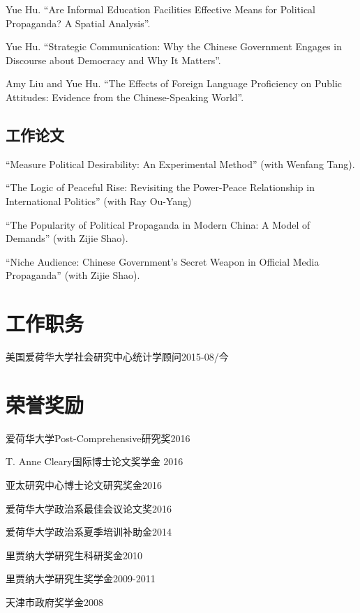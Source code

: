 \documentclass[10.5pt,]{article}
\providecommand{\tightlist}{%
	\setlength{\itemsep}{0pt}\setlength{\parskip}{0pt}}
\renewenvironment{itemize}{
	\begin{list}{}{
			\setlength{\leftmargin}{1.5em}
		}
	}{
	\end{list}
}
\begin{document}
Yue Hu. ``Are Informal Education Facilities Effective Means for
Political Propaganda? A Spatial Analysis''.

Yue Hu. ``Strategic Communication: Why the Chinese Government Engages in
Discourse about Democracy and Why It Matters''.

Amy Liu and Yue Hu. ``The Effects of Foreign Language Proficiency on
Public Attitudes: Evidence from the Chinese-Speaking World''.

\subsection{工作论文}

``Measure Political Desirability: An Experimental Method'' (with Wenfang
Tang).

``The Logic of Peaceful Rise: Revisiting the Power-Peace Relationship in
International Politics'' (with Ray Ou-Yang)

``The Popularity of Political Propaganda in Modern China: A Model of
Demands'' (with Zijie Shao).

``Niche Audience: Chinese Government's Secret Weapon in Official Media
Propaganda'' (with Zijie Shao).

\section{工作职务}

\begin{itemize}
\tightlist
\item
  美国爱荷华大学社会研究中心统计学顾问\hfill 2015-08/今
\end{itemize}

\section{荣誉奖励}

\begin{itemize}
\tightlist
\item
  爱荷华大学Post-Comprehensive研究奖\hfill 2016
\item
  T. Anne Cleary国际博士论文奖学金 \hfill 2016
\item
  亚太研究中心博士论文研究奖金\hfill 2016
\item
  爱荷华大学政治系最佳会议论文奖\hfill 2016
\item
  爱荷华大学政治系夏季培训补助金\hfill 2014
\item
  里贾纳大学研究生科研奖金\hfill 2010
\item
  里贾纳大学研究生奖学金\hfill 2009-2011
\item
  天津市政府奖学金\hfill 2008
\end{itemize}
\end{document}
